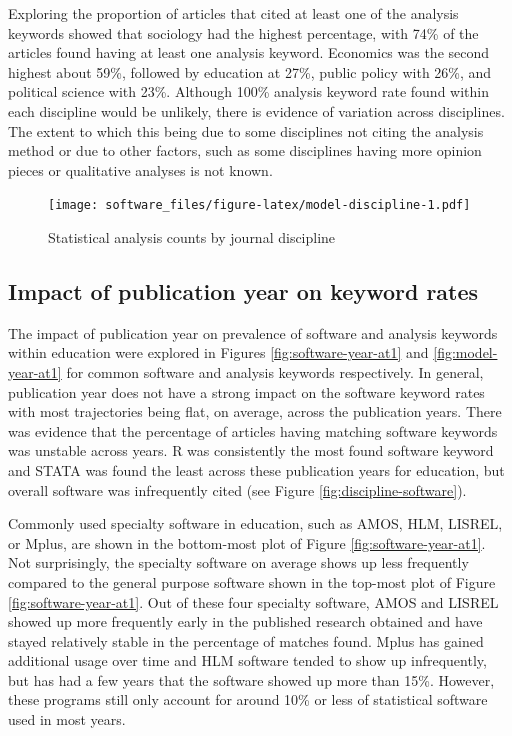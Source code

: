 \documentclass[
  english,
  ,man]{apa7}
\begin{document}
Exploring the proportion of articles that cited at least one of the analysis keywords showed that sociology had the highest percentage, with 74\% of the articles found having at least one analysis keyword. Economics was the second highest about 59\%, followed by education at 27\%, public policy with 26\%, and political science with 23\%. Although 100\% analysis keyword rate found within each discipline would be unlikely, there is evidence of variation across disciplines. The extent to which this being due to some disciplines not citing the analysis method or due to other factors, such as some disciplines having more opinion pieces or qualitative analyses is not known.

\begin{figure}
\centering
\texttt{[image: software\_files/figure-latex/model-discipline-1.pdf]}
\caption{\label{fig:model-discipline}Statistical analysis counts by journal discipline}
\end{figure}

\hypertarget{impact-of-publication-year-on-keyword-rates}{%
\subsection{Impact of publication year on keyword rates}\label{impact-of-publication-year-on-keyword-rates}}

The impact of publication year on prevalence of software and analysis keywords within education were explored in Figures \ref{fig:software-year-at1} and \ref{fig:model-year-at1} for common software and analysis keywords respectively. In general, publication year does not have a strong impact on the software keyword rates with most trajectories being flat, on average, across the publication years. There was evidence that the percentage of articles having matching software keywords was unstable across years. R was consistently the most found software keyword and STATA was found the least across these publication years for education, but overall software was infrequently cited (see Figure \ref{fig:discipline-software}).

Commonly used specialty software in education, such as AMOS, HLM, LISREL, or Mplus, are shown in the bottom-most plot of Figure \ref{fig:software-year-at1}. Not surprisingly, the specialty software on average shows up less frequently compared to the general purpose software shown in the top-most plot of Figure \ref{fig:software-year-at1}. Out of these four specialty software, AMOS and LISREL showed up more frequently early in the published research obtained and have stayed relatively stable in the percentage of matches found. Mplus has gained additional usage over time and HLM software tended to show up infrequently, but has had a few years that the software showed up more than 15\%. However, these programs still only account for around 10\% or less of statistical software used in most years.
\end{document}
